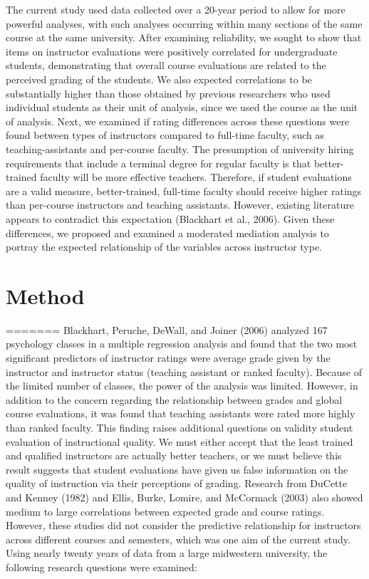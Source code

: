 \documentclass[,man]{apa6}
\theoremstyle{definition}
\theoremstyle{definition}
\theoremstyle{definition}
\theoremstyle{remark}
\begin{document}
The current study used data collected over a 20-year period to allow for
more powerful analyses, with such analyses occurring within many
sections of the same course at the same university. After examining
reliability, we sought to show that items on instructor evaluations were
positively correlated for undergraduate students, demonstrating that
overall course evaluations are related to the perceived grading of the
students. We also expected correlations to be substantially higher than
those obtained by previous researchers who used individual students as
their unit of analysis, since we used the course as the unit of
analysis. Next, we examined if rating differences across these questions
were found between types of instructors compared to full-time faculty,
such as teaching-assistants and per-course faculty. The presumption of
university hiring requirements that include a terminal degree for
regular faculty is that better-trained faculty will be more effective
teachers. Therefore, if student evaluations are a valid measure,
better-trained, full-time faculty should receive higher ratings than
per-course instructors and teaching assistants. However, existing
literature appears to contradict this expectation (Blackhart et al.,
2006). Given these differences, we proposed and examined a moderated
mediation analysis to portray the expected relationship of the variables
across instructor type.

\section{Method}\label{method}
=======
Blackhart, Peruche, DeWall, and Joiner (2006) analyzed 167 psychology
classes in a multiple regression analysis and found that the two most
significant predictors of instructor ratings were average grade given by
the instructor and instructor status (teaching assistant or ranked
faculty). Because of the limited number of classes, the power of the
analysis was limited. However, in addition to the concern regarding the
relationship between grades and global course evaluations, it was found
that teaching assistants were rated more highly than ranked faculty.
This finding raises additional questions on validity student evaluation
of instructional quality. We must either accept that the least trained
and qualified instructors are actually better teachers, or we must
believe this result suggests that student evaluations have given us
false information on the quality of instruction via their perceptions of
grading. Research from DuCette and Kenney (1982) and Ellis, Burke,
Lomire, and McCormack (2003) also showed medium to large correlations
between expected grade and course ratings. However, these studies did
not consider the predictive relationship for instructors across
different courses and semesters, which was one aim of the current study.
Using nearly twenty years of data from a large midwestern university,
the following research questions were examined:
\end{document}
